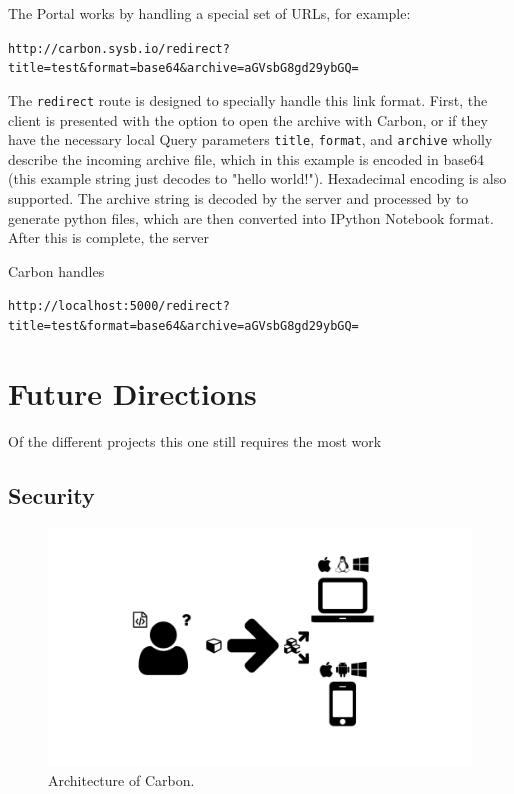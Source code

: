 The Portal works by handling a special set of URLs, for example: 

\texttt{http://carbon.sysb.io/redirect?title=test\&format=base64\&archive=aGVsbG8gd29ybGQ=}

The \texttt{redirect} route is designed to specially handle this link format.
First, the client is presented with the option to open the archive with Carbon, or if they have the necessary local
Query parameters \texttt{title}, \texttt{format}, and \texttt{archive} wholly describe the incoming archive file, which in this example is encoded in base64 (this example string just decodes to "hello world!").
Hexadecimal encoding is also supported.
The archive string is decoded by the server and processed by \autocite{sysbio2014sedml2py} to generate python files, which are then converted into IPython Notebook format.
After this is complete, the server 

Carbon handles

\texttt{http://localhost:5000/redirect?title=test\&format=base64\&archive=aGVsbG8gd29ybGQ=}

\section{Future Directions}

Of the different projects this one still requires the most work
\subsection{Security}

\begin{figure}
  \centering
  \includegraphics[width=\textwidth, page=28, trim=0cm 0cm 12cm 0cm, clip=true]{images/Figures.pdf}
  \caption{Architecture of Carbon.}
  \label{fig:carbon-architecture}
\end{figure}


